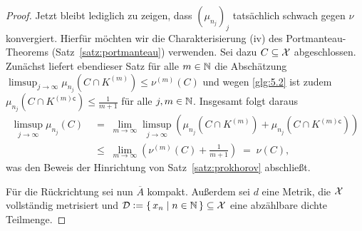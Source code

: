\documentclass[../thesis/thesis.tex]{subfiles}
\begin{document}
\begin{proof}
		Jetzt bleibt lediglich zu zeigen, dass $(\mu_{n_j})_j$ tatsächlich schwach gegen $\nu$ konvergiert. 
		Hierfür möchten wir die Charakterisierung (iv) des Portmanteau-Theorems (Satz~\ref{satz:portmanteau}) verwenden.
		Sei dazu $C \subseteq \mathcal{X}$ abgeschlossen. Zunächst liefert ebendieser Satz für alle $m \in \mathbb{N}$ die 
		Abschätzung $\limsup_{j \to \infty} \mu_{n_j}(C \cap K^{(m)}) \leq \nu^{(m)}(C)$ und wegen \eqref{glg:5.2} ist 
		zudem $\mu_{n_j}(C \cap K^{(m) \mathsf{c}}) \leq  \frac{1}{m+1}$ für alle $j, m \in \mathbb{N}$. Insgesamt folgt daraus 
		\begin{align*}
			\limsup_{j \to \infty} \mu_{n_j}(C) \; &=    \; \lim_{m \to \infty} \limsup_{j \to \infty} 
			\left( \mu_{n_j}(C \cap K^{(m)}) + \mu_{n_j}(C \cap K^{(m) \mathsf{c}}) \right) \\
			&\leq \; \lim_{m \to \infty} \left( \nu^{(m)}(C) + \frac{1}{m+1} \right) 
			\; = \; \nu(C) \text{,}
		\end{align*}
		was den Beweis der Hinrichtung von Satz~\ref{satz:prokhorov} abschließt.
		
		Für die Rückrichtung sei nun $\overline{A}$ kompakt. Außerdem sei $d$ eine Metrik, die $\mathcal{X}$ vollständig metrisiert 
		und $\mathcal{D} \vcentcolon = \left\{\, x_n \; \middle| \; n \in \mathbb{N} \,\right\} \subseteq \mathcal{X}$ eine abzählbare dichte Teilmenge.
		

\end{proof}
\end{document}

